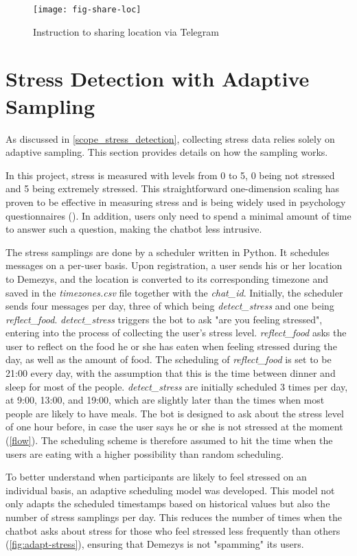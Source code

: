 \begin{figure}[ht]
  \centering
  \texttt{[image: fig-share-loc]}
  \caption{Instruction to sharing location via Telegram}
  \label{fig:share-loc}
\end{figure}

\section{Stress Detection with Adaptive Sampling}
As discussed in \autoref{scope_stress_detection}, collecting stress data relies solely on adaptive sampling. This section provides details on how the sampling works.

In this project, stress is measured with levels from 0 to 5, 0 being not stressed and 5 being extremely stressed. This straightforward one-dimension scaling has proven to be effective in measuring stress and is being widely used in psychology questionnaires (\cite{41_stress_scale}). In addition, users only need to spend a minimal amount of time to answer such a question, making the chatbot less intrusive.

The stress samplings are done by a scheduler written in Python. It schedules messages on a per-user basis. Upon registration, a user sends his or her location to Demezys, and the location is converted to its corresponding timezone and saved in the \emph{timezones.csv} file together with the \emph{chat\_id}. Initially, the scheduler sends four messages per day, three of which being \emph{detect\_stress} and one being \emph{reflect\_food}. \emph{detect\_stress} triggers the bot to ask "are you feeling stressed", entering into the process of collecting the user's stress level. \emph{reflect\_food} asks the user to reflect on the food he or she has eaten when feeling stressed during the day, as well as the amount of food. The scheduling of \emph{reflect\_food} is set to be 21:00 every day, with the assumption that this is the time between dinner and sleep for most of the people. \emph{detect\_stress} are initially scheduled 3 times per day, at 9:00, 13:00, and 19:00, which are slightly later than the times when most people are likely to have meals. The bot is designed to ask about the stress level of one hour before, in case the user says he or she is not stressed at the moment (\autoref{flow}). The scheduling scheme is therefore assumed to hit the time when the users are eating with a higher possibility than random scheduling.

To better understand when participants are likely to feel stressed on an individual basis, an adaptive scheduling model was developed. This model not only adapts the scheduled timestamps based on historical values but also the number of stress samplings per day. This reduces the number of times when the chatbot asks about stress for those who feel stressed less frequently than others (\autoref{fig:adapt-stress}), ensuring that Demezys is not "spamming" its users.

